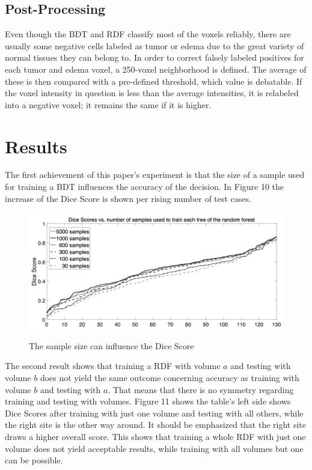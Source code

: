 \documentclass[
12pt,
headsepline,
bibliography=totoc,
twoside=semi,
fleqn
]{scrartcl}
\begin{document}
 \subsection{Post-Processing\label{sec:sec3-4}}
 Even though the BDT and RDF classify most of the voxels reliably, there are usually some negative cells labeled as tumor or edema due to the great variety of normal tissues they can belong to. In order to correct falsely labeled positives for each tumor and edema voxel, a 250-voxel neighborhood is defined. The average of these is then compared with a pre-defined threshold, which value is debatable. If the voxel intensity in question is less than the average intensities, it is relabeled into a negative voxel; it remains the same if it is higher.
\section{Results\label{sec:sec4}}

 The first achievement of this paper's experiment is that the size of a sample used for training a BDT influences the accuracy of the decision. In Figure 10 the increase of the Dice Score is shown per rising number of test cases.
 
 \begin{figure}[H]
 \centering \includegraphics[scale=0.7]{BDT16.png}\label{fig:test}
 \caption{The sample size can influence the Dice Score}
 \end{figure} 

 The second result shows that training a RDF with volume $a$ and testing with volume $b$ does not yield the same outcome concerning accuracy as training with volume $b$ and testing with $a$. That means that there is no symmetry regarding training and testing with volumes. Figure 11 shows the table's left side shows Dice Scores after training with just one volume and testing with all others, while the right site is the other way around. It should be emphasized that the right site draws a higher overall score. This shows that training a whole RDF with just one volume does not yield acceptable results, while training with all volumes but one can be possible. 
\end{document}
